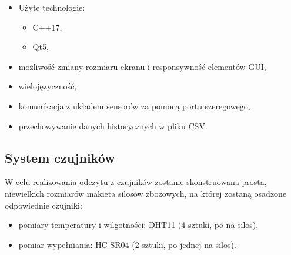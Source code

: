         \begin{itemize}
            \item Użyte technologie: 
            \begin{itemize}
                \item C++17,
                \item Qt5,
            \end{itemize}
            \item możliwość zmiany rozmiaru ekranu i responsywność elementów GUI,
            \item wielojęzyczność,
            \item komunikacja z układem sensorów za pomocą portu szeregowego,
            \item przechowywanie danych historycznych w pliku CSV.
        \end{itemize}

    \subsection{System czujników}
        W celu realizowania odczytu z czujników zostanie skonstruowana prosta, niewielkich rozmiarów makieta silosów zbożowych, na której 
        zostaną osadzone odpowiednie czujniki:
        \begin{itemize}
            \item pomiary temperatury i wilgotności: DHT11 (4 sztuki, po na silos),
            \item pomiar wypełniania: HC SR04 (2 sztuki, po jednej na silos).
        \end{itemize}
    
    